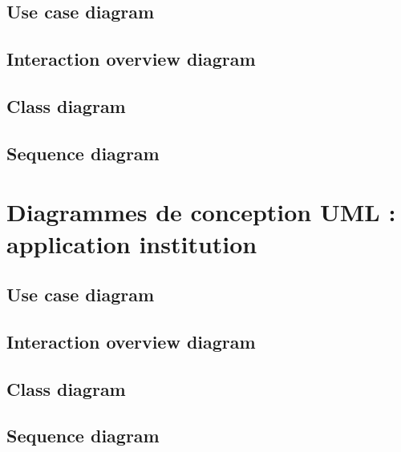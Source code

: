 \documentclass[]{report}
\begin{document}
\subsection{Use case diagram}

\newpage

\subsection{Interaction overview diagram}

\newpage

\subsection{Class diagram}

\newpage

\subsection{Sequence diagram}

\newpage



\section{Diagrammes de conception UML : application institution}



\subsection{Use case diagram}

\newpage

\subsection{Interaction overview diagram}

\newpage

\subsection{Class diagram}

\newpage

\subsection{Sequence diagram}

\newpage
\end{document}
